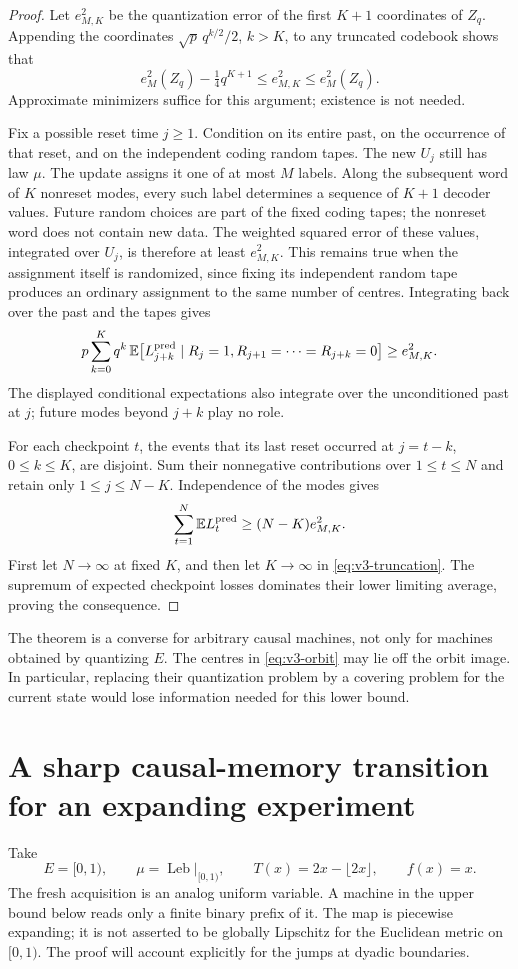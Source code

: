 \begin{proof}
Let $e_{M,K}^2$ be the quantization error of the first $K+1$ coordinates
of $Z_q$. Appending the coordinates $\sqrt p\,q^{k/2}/2$, $k>K$,
to any truncated codebook shows that
\begin{equation}\label{eq:v3-truncation}
 e_M^2(Z_q)-\tfrac14q^{K+1}\le e_{M,K}^2\le e_M^2(Z_q).
\end{equation}
Approximate minimizers suffice for this argument; existence is not needed.

Fix a possible reset time $j\ge1$. Condition on its entire past, on the
occurrence of that reset, and on the independent coding random tapes.
The new $U_j$ still has law $\mu$. The update assigns it one of at most
$M$ labels. Along the subsequent word of $K$ nonreset modes, every such
label determines a sequence of $K+1$ decoder values. Future random choices
are part of the fixed coding tapes; the nonreset word does not contain
new data. The weighted squared error of these values, integrated over
$U_j$, is therefore at least $e_{M,K}^2$. This remains true when the
assignment itself is randomized, since fixing its independent random
tape produces an ordinary assignment to the same number of centres.
Integrating back over the past and the tapes gives
\[
 p\sum_{k=0}^Kq^k\,
 \mathbb E\bigl[L_{j+k}^{\rm pred}\mid R_j=1,
                 R_{j+1}=\cdots=R_{j+k}=0\bigr]
 \ge e_{M,K}^2.
\]
The displayed conditional expectations also integrate over the
unconditioned past at $j$; future modes beyond $j+k$ play no role.

For each checkpoint $t$, the events that its last reset occurred at
$j=t-k$, $0\le k\le K$, are disjoint. Sum their nonnegative
contributions over $1\le t\le N$ and retain only $1\le j\le N-K$.
Independence of the modes gives
\[
 \sum_{t=1}^N\mathbb E L_t^{\rm pred}\ge (N-K)e_{M,K}^2.
\]
First let $N\to\infty$ at fixed $K$, and then let $K\to\infty$ in
\eqref{eq:v3-truncation}. The supremum of expected checkpoint losses
dominates their lower limiting average, proving the consequence.
\end{proof}

The theorem is a converse for arbitrary causal machines, not only for
machines obtained by quantizing $E$. The centres in \eqref{eq:v3-orbit}
may lie off the orbit image. In particular, replacing their quantization
problem by a covering problem for the current state would lose information
needed for this lower bound.

\section{A sharp causal-memory transition for an expanding experiment}
\label{sec:v3-doubling}
Take
\begin{equation}\label{eq:v3-doubling}
 E=[0,1),\qquad \mu=\operatorname{Leb}|_{[0,1)},\qquad
 T(x)=2x-\lfloor2x\rfloor,\qquad f(x)=x.
\end{equation}
The fresh acquisition is an analog uniform variable. A machine in the
upper bound below reads only a finite binary prefix of it. The map is
piecewise expanding; it is not asserted to be globally Lipschitz for the
Euclidean metric on $[0,1)$. The proof will account explicitly for the
jumps at dyadic boundaries.


